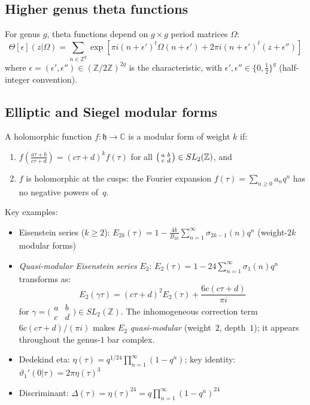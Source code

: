 \subsection{Higher genus theta functions}

For genus $g$, theta functions depend on $g \times g$ period matrices $\Omega$:
\[\Theta[\epsilon](z|\Omega) = \sum_{n \in \mathbb{Z}^g} \exp\left[\pi i(n+\epsilon')^t\Omega(n+\epsilon') + 2\pi i(n+\epsilon')^t(z+\epsilon'')\right]\]
where $\epsilon = (\epsilon', \epsilon'') \in (\mathbb{Z}/2\mathbb{Z})^{2g}$ is the characteristic, with $\epsilon', \epsilon'' \in \{0, \tfrac{1}{2}\}^g$ (half-integer convention).

\subsection{Elliptic and Siegel modular forms}

\begin{definition}
A holomorphic function $f: \mathfrak{h} \to \mathbb{C}$ is a modular form of weight $k$ if:
\begin{enumerate}
\item $f\left(\frac{a\tau+b}{c\tau+d}\right) = (c\tau+d)^k f(\tau)$ for all $\begin{psmallmatrix} a & b \\ c & d \end{psmallmatrix} \in SL_2(\mathbb{Z})$, and
\item $f$ is holomorphic at the cusps: the Fourier expansion $f(\tau) = \sum_{n \geq 0} a_n q^n$ has no negative powers of~$q$.
\end{enumerate}
\end{definition}

Key examples:
\begin{itemize}
\item Eisenstein series ($k \geq 2$): $E_{2k}(\tau) = 1 - \frac{4k}{B_{2k}}\sum_{n=1}^\infty \sigma_{2k-1}(n)q^n$ (weight-$2k$ modular forms)
\item \emph{Quasi-modular Eisenstein series} $E_2$: $E_2(\tau) = 1 - 24\sum_{n=1}^\infty \sigma_1(n)q^n$ transforms as:
\[E_2(\gamma\tau) = (c\tau+d)^2 E_2(\tau) + \frac{6c(c\tau+d)}{\pi i}\]
for $\gamma = \bigl(\begin{smallmatrix} a & b \\ c & d \end{smallmatrix}\bigr) \in SL_2(\mathbb{Z})$. The inhomogeneous correction term $6c(c\tau+d)/(\pi i)$ makes $E_2$ \emph{quasi-modular} (weight~$2$, depth~$1$); it appears throughout the genus-$1$ bar complex.
\item Dedekind eta: $\eta(\tau) = q^{1/24}\prod_{n=1}^\infty(1-q^n)$; key identity: $\vartheta_1'(0|\tau) = 2\pi\eta(\tau)^3$
\item Discriminant: $\Delta(\tau) = \eta(\tau)^{24} = q\prod_{n=1}^\infty(1-q^n)^{24}$
\end{itemize}

